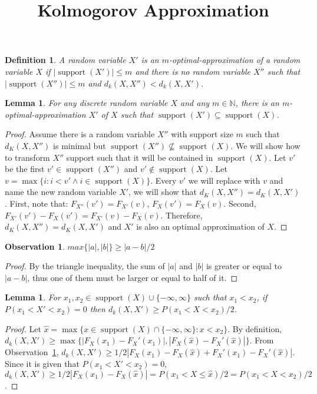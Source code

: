 \documentclass{article}
\title{Kolmogorov Approximation}
\newtheorem{lemma}[thm]{Lemma}
\newtheorem{definition}[thm]{Definition}
\newtheorem{observation}[thm]{Observation}
\DeclareMathOperator{\support}{support}
\begin{document}

\maketitle


\begin{definition}
A random variable $X'$ is an $m$-optimal-approximation of a random variable $X$ if $|\support(X')| \leq m$ and there is no random variable $X''$ such that $|\support(X'')| \leq m$ and $d_k(X,X'') < d_k(X,X')$.
\end{definition}

\begin{lemma}
	For any discrete random variable $X$ and any $m \in \mathbb{N}$, there is an $m$-optimal-approximation $X'$ of $X$ such that $\support(X') \subseteq \support(X)$.
\end{lemma}
\begin{proof}
Assume there is a random variable $X''$ with support size $m$ such that $d_K(X,X'')$ is minimal but $\support(X'')\nsubseteq\support(X)$.
We will show how to transform $X''$ support such that it will be contained in $\support(X)$. Let $v'$ be the first $v'\in\support(X'')$ and $v' \not\in\support(X)$. Let $v=\max\{i: i<v' \wedge i\in\support(X)\}$. Every $v'$ we will replace with $v$ and name the new random variable $X'$, we will show that $d_K(X,X'') = d_K(X,X')$. First, note that:
$F_{X''}(v')=F_{X'}(v)$, $F_{X}(v')=F_{X}(v)$.
Second,  $F_{X'}(v')-F_{X}(v') = F_{X'}(v)-F_{X}(v)$. Therefore, $d_K(X,X'') = d_K(X,X')$ and $X'$ is also an optimal approximation of $X$.
\end{proof}

\begin{observation}\label{obs:ab}
	$max\{|a|,|b|\} \geq |a-b|/2$
\end{observation}
\begin{proof}
	By the triangle inequality, the sum of $|a|$ and $|b|$ is greater or equal to $|a-b|$, thus one of them must be larger or equal to half of it. 
\end{proof}

\begin{lemma}\label{lem:geq}
	For $x_1, x_2 \in \support(X) \cup \{-\infty,\infty\}$ such that $x_1 < x_2$, if $P(x_1 < X' < x_2)=0$  then 
	$d_k(X,X') \geq P(x_1 < X < x_2)/2$.
\end{lemma}
\begin{proof}
	Let $\hat x=\max \{x \in \support(X) \cap\{ -\infty, \infty\}  \colon x < x_2 \}$. By definition, $d_k(X,X') \geq \max \{|F_X(x_1) - F_X'(x_1)|, |F_X(\hat x) - F_X'(\hat x)| \}$. From Observation~\ref{obs:ab}, $d_k(X,X') \geq 1/2|F_X(x_1) - F_X(\hat x) + F_X'(x_1)- F_X'(\hat x)|$. Since it is given that $P(x_1 < X' < x_2)=0$, $d_k(X,X') \geq 1/2|F_X(x_1) - F_X(\hat x) | =  P(x_1 < X \leq \hat x)/2 = P(x_1 < X < x_2)/2$.
\end{proof}
\end{document}
